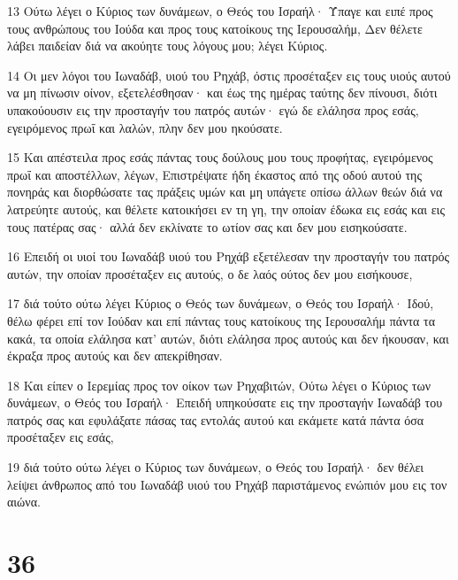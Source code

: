 \par 13 Ούτω λέγει ο Κύριος των δυνάμεων, ο Θεός του Ισραήλ· Ύπαγε και ειπέ προς τους ανθρώπους του Ιούδα και προς τους κατοίκους της Ιερουσαλήμ, Δεν θέλετε λάβει παιδείαν διά να ακούητε τους λόγους μου; λέγει Κύριος.
\par 14 Οι μεν λόγοι του Ιωναδάβ, υιού του Ρηχάβ, όστις προσέταξεν εις τους υιούς αυτού να μη πίνωσιν οίνον, εξετελέσθησαν· και έως της ημέρας ταύτης δεν πίνουσι, διότι υπακούουσιν εις την προσταγήν του πατρός αυτών· εγώ δε ελάλησα προς εσάς, εγειρόμενος πρωΐ και λαλών, πλην δεν μου ηκούσατε.
\par 15 Και απέστειλα προς εσάς πάντας τους δούλους μου τους προφήτας, εγειρόμενος πρωΐ και αποστέλλων, λέγων, Επιστρέψατε ήδη έκαστος από της οδού αυτού της πονηράς και διορθώσατε τας πράξεις υμών και μη υπάγετε οπίσω άλλων θεών διά να λατρεύητε αυτούς, και θέλετε κατοικήσει εν τη γη, την οποίαν έδωκα εις εσάς και εις τους πατέρας σας· αλλά δεν εκλίνατε το ωτίον σας και δεν μου εισηκούσατε.
\par 16 Επειδή οι υιοί του Ιωναδάβ υιού του Ρηχάβ εξετέλεσαν την προσταγήν του πατρός αυτών, την οποίαν προσέταξεν εις αυτούς, ο δε λαός ούτος δεν μου εισήκουσε,
\par 17 διά τούτο ούτω λέγει Κύριος ο Θεός των δυνάμεων, ο Θεός του Ισραήλ· Ιδού, θέλω φέρει επί τον Ιούδαν και επί πάντας τους κατοίκους της Ιερουσαλήμ πάντα τα κακά, τα οποία ελάλησα κατ' αυτών, διότι ελάλησα προς αυτούς και δεν ήκουσαν, και έκραξα προς αυτούς και δεν απεκρίθησαν.
\par 18 Και είπεν ο Ιερεμίας προς τον οίκον των Ρηχαβιτών, Ούτω λέγει ο Κύριος των δυνάμεων, ο Θεός του Ισραήλ· Επειδή υπηκούσατε εις την προσταγήν Ιωναδάβ του πατρός σας και εφυλάξατε πάσας τας εντολάς αυτού και εκάμετε κατά πάντα όσα προσέταξεν εις εσάς,
\par 19 διά τούτο ούτω λέγει ο Κύριος των δυνάμεων, ο Θεός του Ισραήλ· δεν θέλει λείψει άνθρωπος από του Ιωναδάβ υιού του Ρηχάβ παριστάμενος ενώπιόν μου εις τον αιώνα.

\chapter{36}

